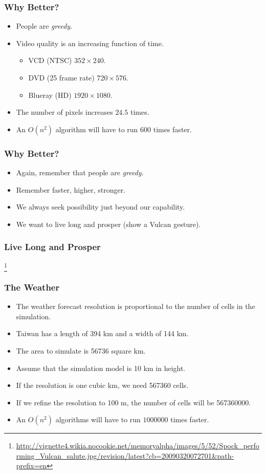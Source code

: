 \documentclass{beamer}
\begin{document}
\begin{CJK}{UTF8}{bsmi}
  \begin{frame}
    \frametitle{Why Better?}
    \begin{itemize}
    \item People are {\em greedy}.
    \item Video quality is an increasing function of time.
      \begin{itemize}
      \item VCD (NTSC) $352 \times 240$.
      \item DVD (25 frame rate) $720 \times 576$.
      \item Blueray (HD) $1920 \times 1080$.
      \end{itemize}
    \item The number of pixels increases $24.5$ times.
    \item An $O(n^2)$ algorithm will have to run $600$ times faster.
    \end{itemize}
  \end{frame}

  \begin{frame}
    \frametitle{Why Better?}
    \begin{itemize}
    \item Again, remember that people are {\em greedy}.
    \item Remember faster, higher, stronger.
    \item We always seek possibility just beyond our capability.
    \item We want to live long and prosper (show a Vulcan gesture).
    \end{itemize}
  \end{frame}

  \begin{frame}
    \frametitle{Live Long and Prosper}
    \centerline{}
    \footnote{\url{http://vignette4.wikia.nocookie.net/memoryalpha/images/5/52/Spock_performing_Vulcan_salute.jpg/revision/latest?cb=20090320072701&path-prefix=en}}
  \end{frame}

  \begin{frame}
    \frametitle{The Weather}
    \begin{itemize}
    \item The weather forecast resolution is proportional to the number of
      cells in the simulation.
    \item Taiwan has a length of 394 km and a width of 144 km.
    \item The area to simulate is 56736 square km. 
    \item Assume that the simulation model is 10 km in height.
    \item If the resolution is one cubic km, we need 567360 cells.
    \item If we refine the resolution to 100 m, the number of cells will be
      567360000.
    \item An $O(n^2)$ algorithms will have to run $1000000$ times faster.
    \end{itemize}
  \end{frame}


\end{CJK}
\end{document}
